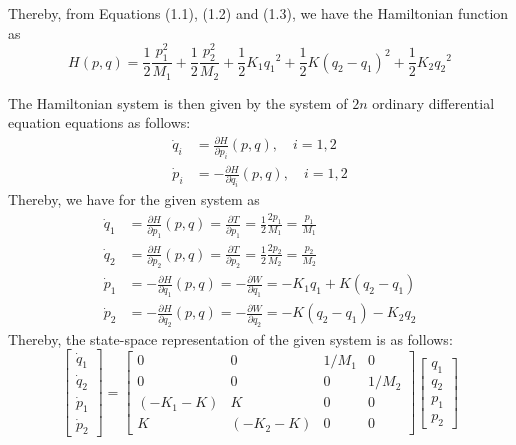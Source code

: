 Thereby, from Equations (1.1), (1.2) and (1.3), we have the Hamiltonian function as
\[
    H(p,q) =
    \frac{1}{2} \frac{p_1^2}{M_1}
    + \frac{1}{2} \frac{p_2^2}{M_2}
    + \frac{1}{2} K_1 {q_1}^2
    + \frac{1}{2} K {(q_2 - q_1)}^2
    + \frac{1}{2} K_2 {q_2}^2
    \tag{1.4}
\]

The Hamiltonian system is then given by the system of \(2n\) ordinary differential equation equations as follows:
\[
    \begin{aligned}
        \dot q_i & = \frac{\partial H}{\partial p_i}(p,q), \quad i = 1,2  \\
        \dot p_i & = -\frac{\partial H}{\partial q_i}(p,q), \quad i = 1,2
    \end{aligned}
    \tag{1.5}
\]
Thereby, we have for the given system as
\[
    \begin{aligned}
        \dot q_1 & = \frac{\partial H}{\partial p_1}(p,q) = \frac{\partial T}{\partial p_1} = \frac{1}{2}\frac{2 p_1}{M_1} = \frac{p_1}{M_1} \\
        \dot q_2 & = \frac{\partial H}{\partial p_2}(p,q) = \frac{\partial T}{\partial p_2} = \frac{1}{2}\frac{2 p_2}{M_2} = \frac{p_2}{M_2} \\
        \dot p_1 & = -\frac{\partial H}{\partial q_1}(p,q) = - \frac{\partial W}{\partial q_1} = -K_1 q_1 + K (q_2 - q_1)                    \\
        \dot p_2 & = -\frac{\partial H}{\partial q_2}(p,q) = - \frac{\partial W}{\partial q_2} = -K (q_2 - q_1) - K_2 q_2
    \end{aligned}
\]
Thereby, the state-space representation of the given system is as follows:
\[
    \boxed{
        \begin{bmatrix}
            \dot{q}_1 \\
            \dot{q}_2 \\
            \dot{p}_1 \\
            \dot{p}_2
        \end{bmatrix}
        =
        \begin{bmatrix}
            0          & 0          & 1/M_1 & 0     \\
            0          & 0          & 0     & 1/M_2 \\
            (-K_1 - K) & K          & 0     & 0     \\
            K          & (-K_2 - K) & 0     & 0
        \end{bmatrix}
        \begin{bmatrix}
            q_1 \\
            q_2 \\
            p_1 \\
            p_2
        \end{bmatrix}
    }
    \tag{1.6}
\]

